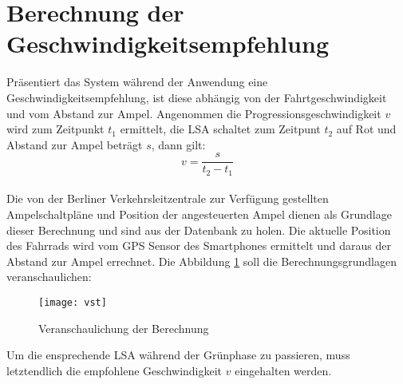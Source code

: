 \section{Berechnung der Geschwindigkeitsempfehlung}
Präsentiert das System während der Anwendung eine Geschwindigkeitsempfehlung, ist diese abhängig von der Fahrtgeschwindigkeit und vom Abstand zur Ampel. Angenommen die Progressionsgeschwindigkeit $v$ wird zum Zeitpunkt $t_{1}$ ermittelt, die \gls {LSA} schaltet zum Zeitpunt $t_{2}$ auf Rot und Abstand zur Ampel beträgt $s$, dann gilt: \\
\[ v = \frac{s}{t_{2} - t_{1}} \] \\
Die von der Berliner Verkehrsleitzentrale zur Verfügung gestellten Ampelschaltpläne und Position der angesteuerten Ampel dienen als Grundlage dieser Berechnung und sind aus der Datenbank zu holen. Die aktuelle Position des Fahrrads wird vom \gls{GPS} Sensor des \glspl{Smartphone} ermittelt und daraus der Abstand zur Ampel errechnet. Die Abbildung \ref{fig:vst} soll die Berechnungsgrundlagen veranschaulichen: 
\begin{figure}[H]  
    \centering  
    \texttt{[image: vst]}     
    \caption[Berechnung Progressionsgeschwindigkeit]{Veranschaulichung der Berechnung}
    \label{fig:vst}
\end{figure}
Um die ensprechende \gls{LSA} während der Grünphase zu passieren, muss letztendlich die empfohlene Geschwindigkeit $v$ eingehalten werden.
